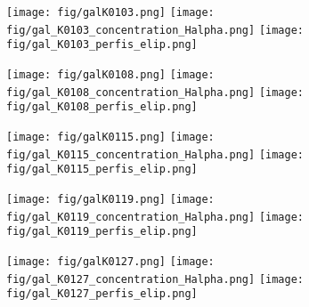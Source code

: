 \begin{figure}[!ht]
\begin{center}
\setcaptionmargin{1cm}
\texttt{[image: fig/galK0103.png]}
\texttt{[image: fig/gal\_K0103\_concentration\_Halpha.png]}
\texttt{[image: fig/gal\_K0103\_perfis\_elip.png]}
\end{center}
\end{figure}


\begin{figure}[!ht]
\begin{center}
\setcaptionmargin{1cm}
\texttt{[image: fig/galK0108.png]}
\texttt{[image: fig/gal\_K0108\_concentration\_Halpha.png]}
\texttt{[image: fig/gal\_K0108\_perfis\_elip.png]}
\end{center}
\end{figure}


\begin{figure}[!ht]
\begin{center}
\setcaptionmargin{1cm}
\texttt{[image: fig/galK0115.png]}
\texttt{[image: fig/gal\_K0115\_concentration\_Halpha.png]}
\texttt{[image: fig/gal\_K0115\_perfis\_elip.png]}
\end{center}
\end{figure}


\begin{figure}[!ht]
\begin{center}
\setcaptionmargin{1cm}
\texttt{[image: fig/galK0119.png]}
\texttt{[image: fig/gal\_K0119\_concentration\_Halpha.png]}
\texttt{[image: fig/gal\_K0119\_perfis\_elip.png]}
\end{center}
\end{figure}


\begin{figure}[!ht]
\begin{center}
\setcaptionmargin{1cm}
\texttt{[image: fig/galK0127.png]}
\texttt{[image: fig/gal\_K0127\_concentration\_Halpha.png]}
\texttt{[image: fig/gal\_K0127\_perfis\_elip.png]}
\end{center}
\end{figure}


